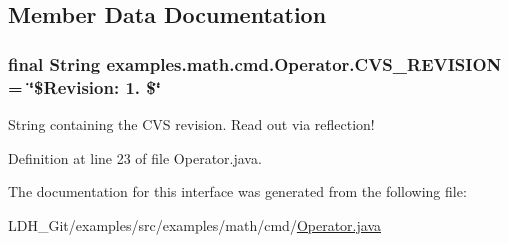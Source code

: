 \subsection{Member Data Documentation}
\hypertarget{interfaceexamples_1_1math_1_1cmd_1_1_operator_ab663b9142aea9a3bfa24565216dba755}{
\subsubsection[{C\-V\-S\-\_\-\-R\-E\-V\-I\-S\-I\-O\-N}]{\setlength{\rightskip}{0pt plus 5cm}final String examples.\-math.\-cmd.\-Operator.\-C\-V\-S\-\_\-\-R\-E\-V\-I\-S\-I\-O\-N = \char`\"{}\$Revision\-: 1. \$\char`\"{}\hspace{0.3cm}{\ttfamily [static]}}}\label{interfaceexamples_1_1math_1_1cmd_1_1_operator_ab663b9142aea9a3bfa24565216dba755}
String containing the C\-V\-S revision. Read out via reflection! 

Definition at line 23 of file Operator.\-java.



The documentation for this interface was generated from the following file\-:\begin{DoxyCompactItemize}
\item 
L\-D\-H\-\_\-\-Git/examples/src/examples/math/cmd/\hyperlink{_operator_8java}{Operator.\-java}\end{DoxyCompactItemize}
